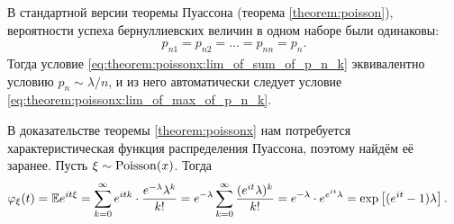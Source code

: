 \documentclass[../main.tex]{subfiles}
\begin{document}
\begin{remrk*}
 В стандартной версии теоремы Пуассона (теорема \ref{theorem:poisson}), вероятности успеха бернуллиевских величин в одном наборе были одинаковы:
 \begin{align*}
  p_{n 1} = p_{n 2} = \ldots = p_{n n} = p_n.
 \end{align*} Тогда условие \eqref{eq:theorem:poissonx:lim_of_sum_of_p_n_k} эквивалентно условию $ p_n \sim \lambda / n $, и из него автоматически следует условие \eqref{eq:theorem:poissonx:lim_of_max_of_p_n_k}.
\end{remrk*}

\begin{remrk}
 \label{remark:poisson_char_func}
 В доказательстве теоремы \ref{theorem:poissonx} нам потребуется характеристическая функция распределения Пуассона, поэтому найдём её заранее. Пусть $ \xi \sim \mathrm{Poisson}(x) $. Тогда
 \begin{align*}
  \varphi_\xi(t) &= \mathbb E e^{it\xi} = \sum_{k=0}^{\infty}e^{itk} \cdot \frac{e^{-\lambda}\lambda^{k}}{k!} = e^{-\lambda} \sum_{k=0}^{\infty} \frac{(e^{it}\lambda)^{k}}{k!} = e^{-\lambda} \cdot e^{e^{it}\lambda} = \exp \left[ (e^{it}-1)\lambda \right].
 \end{align*}
\end{remrk}
\end{document}
